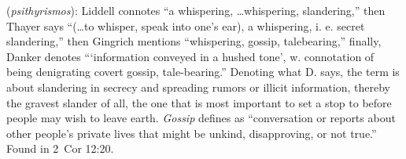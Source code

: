 \item[Gossip,]

(\textit{psithyrismos}):
Liddell connotes ``a whispering, \ldots whispering, slandering,'' then Thayer says ``(\ldots to whisper, speak into one's ear), a whispering, i. e. secret slandering,'' then Gingrich mentions ``whispering, gossip, talebearing,'' finally, Danker denotes ```information conveyed in a hushed tone', w. connotation of being denigrating covert gossip, tale-bearing.'' Denoting what D. says, the term is about slandering in secrecy and spreading rumors or illicit information, thereby the gravest slander of all, the one that is most important to set a stop to before people may wish to leave earth. \emph{Gossip} defines as ``conversation or reports about other people's private lives that might be unkind, disapproving, or not true.''
Found in 2~Cor 12:20.
